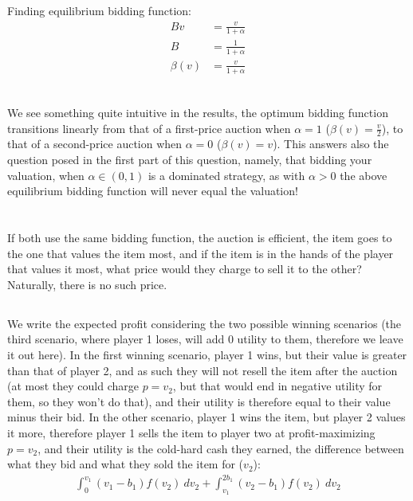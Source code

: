 \documentclass[a4paper,12pt]{article}
\begin{document}
\subsection{}
%
Finding equilibrium bidding function: 
%
\begin{align*}
Bv &= \frac{v}{1 + \alpha} \\
B &= \frac{1}{1 + \alpha} \\
\beta(v) &= \frac{v}{1 + \alpha} \\
\end{align*}

\subsection{}
%
We see something quite intuitive in the results, the optimum bidding function transitions linearly from that of a first-price auction when $\alpha = 1$ ($\beta(v) = \frac{v}{2}$), to that of a second-price auction when $\alpha = 0$ ($\beta(v) = v$). This answers also the question posed in the first part of this question, namely, that bidding your valuation, when $\alpha \in (0,1)$ is a dominated strategy, as with $\alpha > 0$ the above equilibrium bidding function will never equal the valuation!

\section{}
\subsection{}
If both use the same bidding function, the auction is efficient, the item goes to the one that values the item most, and if the item is in the hands of the player that values it most, what price would they charge to sell it to the other? Naturally, there is no such price.
\subsection{}
% 
We write the expected profit considering the two possible winning scenarios (the third scenario, where player 1 loses, will add 0 utility to them, therefore we leave it out here). In the first winning scenario, player 1 wins, but their value is greater than that of player 2, and as such they will not resell the item after the auction (at most they could charge $p = v_2$, but that would end in negative utility for them, so they won't do that), and their utility is therefore equal to their value minus their bid. In the other scenario, player 1 wins the item, but player 2 values it more, therefore player 1 sells the item to player two at profit-maximizing $p = v_2$, and their utility is the cold-hard cash they earned, the difference between what they bid and what they sold the item for ($v_2$):
\begin{align} \label{eq:utility}
\int_0^{v_1}(v_1 - b_1)f(v_2) \ dv_2 + \int_{v_1}^{2b_1}(v_2 - b_1)f(v_2) \ dv_2
\end{align}
\end{document}
